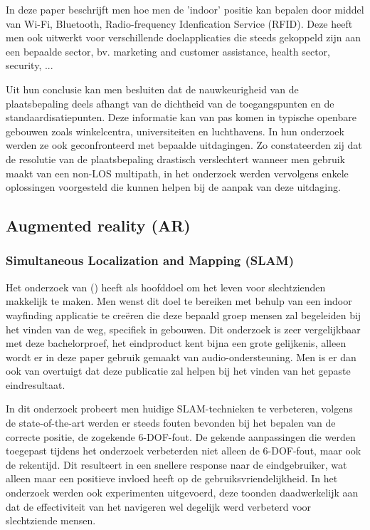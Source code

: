 In deze paper beschrijft men hoe men de 'indoor' positie kan bepalen door middel van Wi-Fi, Bluetooth, Radio-frequency Idenfication Service (RFID). Deze heeft men ook uitwerkt voor verschillende doelapplicaties die steeds gekoppeld zijn aan een bepaalde sector, bv. marketing and customer assistance, health sector, security, ...

Uit hun conclusie kan men besluiten dat de nauwkeurigheid van de plaatsbepaling deels afhangt van de dichtheid van de toegangspunten en de standaardisatiepunten. Deze informatie kan van pas komen in typische openbare gebouwen zoals winkelcentra, universiteiten en luchthavens. In hun onderzoek werden ze ook geconfronteerd met bepaalde uitdagingen. Zo constateerden zij dat de resolutie van de plaatsbepaling drastisch verslechtert wanneer men gebruik maakt van een non-LOS multipath, in het onderzoek werden vervolgens enkele oplossingen voorgesteld die kunnen helpen bij de aanpak van deze uitdaging.
 

\subsection{Augmented reality (AR)}

\subsubsection{Simultaneous Localization and Mapping (SLAM)}
Het onderzoek van \textcite{Zhang2017} () heeft als hoofddoel om het leven voor slechtzienden makkelijk te maken. Men wenst dit doel te bereiken met behulp van een indoor wayfinding applicatie te creëren die deze bepaald groep mensen zal begeleiden bij het vinden van de weg, specifiek in gebouwen. Dit onderzoek is zeer vergelijkbaar met deze bachelorproef, het eindproduct kent bijna een grote gelijkenis, alleen wordt er in deze paper gebruik gemaakt van audio-ondersteuning. Men is er dan ook van overtuigt dat deze publicatie zal helpen bij het vinden van het gepaste eindresultaat.

In dit onderzoek probeert men huidige SLAM-technieken te verbeteren, volgens de state-of-the-art werden er steeds fouten bevonden bij het bepalen van de correcte positie, de zogekende 6-DOF-fout. De gekende aanpassingen die werden toegepast tijdens het onderzoek verbeterden niet alleen de 6-DOF-fout, maar ook de rekentijd. Dit resulteert in een snellere response naar de eindgebruiker, wat alleen maar een positieve invloed heeft op de gebruiksvriendelijkheid. In het onderzoek werden ook experimenten uitgevoerd, deze toonden daadwerkelijk aan dat de effectiviteit van het navigeren wel degelijk werd verbeterd voor slechtziende mensen.

